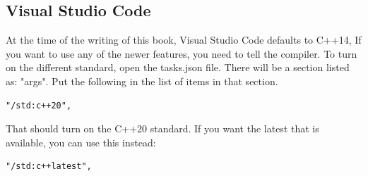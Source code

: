 \subsection{Visual Studio Code}
At the time of the writing of this book, Visual Studio Code defaults to C++14, If you want to use any of the newer features, you need to tell
the compiler. To turn on the different standard, open the tasks.json file. There will be a section listed as: "args". Put the following in the list of items in that section.
\begin{verbatim}
"/std:c++20",    
\end{verbatim}
That should turn on the C++20 standard. If you want the latest that is
available, you can use this instead:
\begin{verbatim}
"/std:c++latest",
\end{verbatim}
